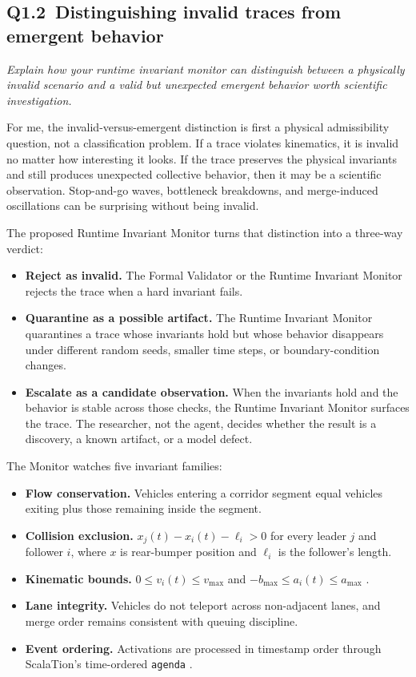 \begin{bibunit}[plainnat]
\subsection{Q1.2\ Distinguishing invalid traces from emergent behavior}

\textit{Explain how your runtime invariant monitor can distinguish between a physically invalid scenario and a valid but unexpected emergent behavior worth scientific investigation.}

For me, the invalid-versus-emergent distinction is first a physical
admissibility question, not a classification problem. If a trace violates
kinematics, it is invalid no matter how interesting it looks. If the trace
preserves the physical invariants and still produces unexpected collective
behavior, then it may be a scientific observation. Stop-and-go waves,
bottleneck breakdowns, and merge-induced oscillations can be surprising
without being invalid.

The proposed Runtime Invariant Monitor turns that distinction into a three-way
verdict:

\begin{itemize}
    \item \textbf{Reject as invalid.} The Formal Validator or the Runtime
    Invariant Monitor rejects the trace when a hard invariant fails.
    \item \textbf{Quarantine as a possible artifact.} The Runtime Invariant
    Monitor quarantines a trace whose invariants hold but whose behavior
    disappears under different random seeds, smaller time steps, or
    boundary-condition changes.
    \item \textbf{Escalate as a candidate observation.} When the invariants
    hold and the behavior is stable across those checks, the Runtime
    Invariant Monitor surfaces the trace. The researcher, not the agent, decides whether
    the result is a discovery, a known artifact, or a model defect.
\end{itemize}

The Monitor watches five invariant families:

\begin{itemize}
    \item \textbf{Flow conservation.} Vehicles entering a corridor segment
    equal vehicles exiting plus those remaining inside the segment.
    \item \textbf{Collision exclusion.}
    $x_j(t)-x_i(t)-\ell_i > 0$ for every leader $j$ and follower $i$, where
    $x$ is rear-bumper position and $\ell_i$ is the follower's length.
    \item \textbf{Kinematic bounds.}
    $0 \leq v_i(t) \leq v_{\max}$ and
    $-b_{\max} \leq a_i(t) \leq a_{\max}$
    \citep{treiber2013book}.
    \item \textbf{Lane integrity.} Vehicles do not teleport across
    non-adjacent lanes, and merge order remains consistent with queuing
    discipline.
    \item \textbf{Event ordering.} Activations are processed in timestamp order
    through ScalaTion's time-ordered \texttt{agenda}
    \citep{law1991simulation}.
\end{itemize}


\end{bibunit}
